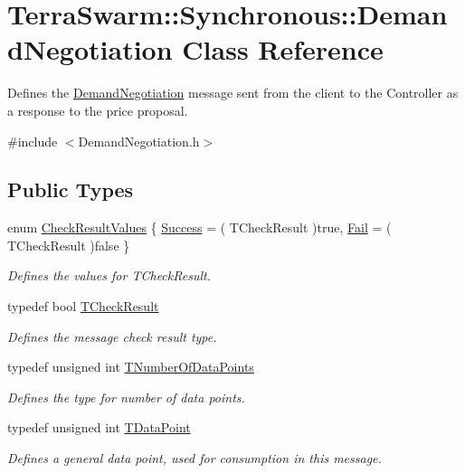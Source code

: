 \hypertarget{class_terra_swarm_1_1_synchronous_1_1_demand_negotiation}{\section{Terra\-Swarm\-:\-:Synchronous\-:\-:Demand\-Negotiation Class Reference}
\label{class_terra_swarm_1_1_synchronous_1_1_demand_negotiation}
}


Defines the \hyperlink{class_terra_swarm_1_1_synchronous_1_1_demand_negotiation}{Demand\-Negotiation} message sent from the client to the Controller as a response to the price proposal.  




{\ttfamily \#include $<$Demand\-Negotiation.\-h$>$}

\subsection*{Public Types}
\begin{DoxyCompactItemize}
\item 
enum \hyperlink{class_terra_swarm_1_1_synchronous_1_1_demand_negotiation_a62e3d42f7a50e61a19ac2bc6349c302d}{Check\-Result\-Values} \{ \hyperlink{class_terra_swarm_1_1_synchronous_1_1_demand_negotiation_a62e3d42f7a50e61a19ac2bc6349c302da3a190a1e60e673508e7d0b752edada78}{Success} = ( T\-Check\-Result )true, 
\hyperlink{class_terra_swarm_1_1_synchronous_1_1_demand_negotiation_a62e3d42f7a50e61a19ac2bc6349c302da172b152bb4bc982cf5d623de5a1e696d}{Fail} = ( T\-Check\-Result )false
 \}
\begin{DoxyCompactList}\small\item\em Defines the values for T\-Check\-Result. \end{DoxyCompactList}\item 
typedef bool \hyperlink{class_terra_swarm_1_1_synchronous_1_1_demand_negotiation_abf70719cd7b70d3eeecb1949bc2157a3}{T\-Check\-Result}
\begin{DoxyCompactList}\small\item\em Defines the message check result type. \end{DoxyCompactList}\item 
typedef unsigned int \hyperlink{class_terra_swarm_1_1_synchronous_1_1_demand_negotiation_aeaaae7fc1861d9af2bff4c9dcb4d89ac}{T\-Number\-Of\-Data\-Points}
\begin{DoxyCompactList}\small\item\em Defines the type for number of data points. \end{DoxyCompactList}\item 
typedef unsigned int \hyperlink{class_terra_swarm_1_1_synchronous_1_1_demand_negotiation_a6660353fa0a65775070bba8571a76e3d}{T\-Data\-Point}
\begin{DoxyCompactList}\small\item\em Defines a general data point, used for consumption in this message. \end{DoxyCompactList}\end{DoxyCompactItemize}
